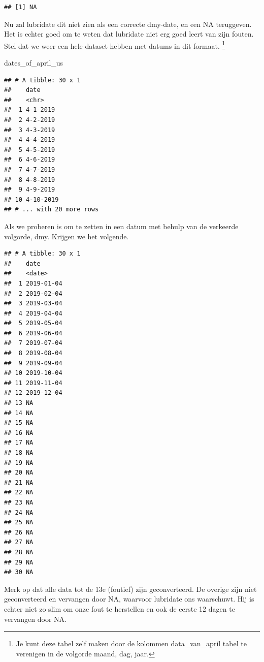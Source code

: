 \documentclass[]{tufte-book}
\newenvironment{Shaded}{}{}
\newcommand{\DataTypeTok}[1]{\textcolor[rgb]{0.56,0.13,0.00}{#1}}
\newcommand{\KeywordTok}[1]{\textcolor[rgb]{0.00,0.44,0.13}{\textbf{#1}}}
\newcommand{\NormalTok}[1]{#1}
\newcommand{\OperatorTok}[1]{\textcolor[rgb]{0.40,0.40,0.40}{#1}}
\newcommand{\StringTok}[1]{\textcolor[rgb]{0.25,0.44,0.63}{#1}}
\begin{document}
\begin{verbatim}
## [1] NA
\end{verbatim}

Nu zal lubridate dit niet zien als een correcte dmy-date, en een NA teruggeven. Het is echter goed om te weten dat lubridate niet erg goed leert van zijn fouten. Stel dat we weer een hele dataset hebben met datums in dit formaat. \footnote{Je kunt deze tabel zelf maken door de kolommen data\_van\_april tabel te verenigen in de volgorde maand, dag, jaar.}

\begin{Shaded}
\begin{Highlighting}[]
\NormalTok{dates_of_april_us}
\end{Highlighting}
\end{Shaded}

\begin{verbatim}
## # A tibble: 30 x 1
##    date     
##    <chr>    
##  1 4-1-2019 
##  2 4-2-2019 
##  3 4-3-2019 
##  4 4-4-2019 
##  5 4-5-2019 
##  6 4-6-2019 
##  7 4-7-2019 
##  8 4-8-2019 
##  9 4-9-2019 
## 10 4-10-2019
## # ... with 20 more rows
\end{verbatim}

Als we proberen is om te zetten in een datum met behulp van de verkeerde volgorde, dmy. Krijgen we het volgende.

\begin{verbatim}
## # A tibble: 30 x 1
##    date      
##    <date>    
##  1 2019-01-04
##  2 2019-02-04
##  3 2019-03-04
##  4 2019-04-04
##  5 2019-05-04
##  6 2019-06-04
##  7 2019-07-04
##  8 2019-08-04
##  9 2019-09-04
## 10 2019-10-04
## 11 2019-11-04
## 12 2019-12-04
## 13 NA        
## 14 NA        
## 15 NA        
## 16 NA        
## 17 NA        
## 18 NA        
## 19 NA        
## 20 NA        
## 21 NA        
## 22 NA        
## 23 NA        
## 24 NA        
## 25 NA        
## 26 NA        
## 27 NA        
## 28 NA        
## 29 NA        
## 30 NA
\end{verbatim}

\begin{Shaded}
\end{Shaded}

Merk op dat alle data tot de 13e (foutief) zijn geconverteerd. De overige zijn niet geconverteerd en vervangen door NA, waarvoor lubridate ons waarschuwt. Hij is echter niet zo slim om onze fout te herstellen en ook de eerste 12 dagen te vervangen door NA.
\end{document}
